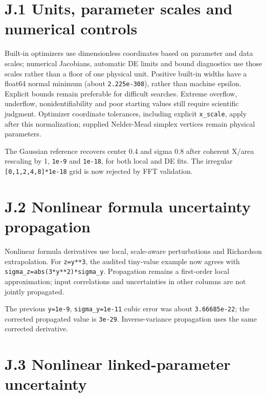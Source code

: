 \documentclass[
  10pt,
  a4paper,
  oneside]{scrreprt}
\begin{document}
\hypertarget{j.1-units-parameter-scales-and-numerical-controls}{%
\section{J.1 Units, parameter scales and numerical
controls}\label{j.1-units-parameter-scales-and-numerical-controls}}

Built-in optimizers use dimensionless coordinates based on parameter and
data scales; numerical Jacobians, automatic DE limits and bound
diagnostics use those scales rather than a floor of one physical unit.
Positive built-in widths have a float64 normal minimum (about
\texttt{2.225e-308}), rather than machine epsilon. Explicit bounds
remain preferable for difficult searches. Extreme overflow, underflow,
nonidentifiability and poor starting values still require scientific
judgment. Optimizer coordinate tolerances, including explicit
\texttt{x\_scale}, apply after this normalization; supplied Nelder-Mead
simplex vertices remain physical parameters.

The Gaussian reference recovers center 0.4 and sigma 0.8 after coherent
X/area rescaling by 1, \texttt{1e-9} and \texttt{1e-18}, for both local
and DE fits. The irregular \texttt{{[}0,1,2,4,8{]}*1e-18} grid is now
rejected by FFT validation.

\hypertarget{j.2-nonlinear-formula-uncertainty-propagation}{%
\section{J.2 Nonlinear formula uncertainty
propagation}\label{j.2-nonlinear-formula-uncertainty-propagation}}

Nonlinear formula derivatives use local, scale-aware perturbations and
Richardson extrapolation. For \texttt{z=y**3}, the audited tiny-value
example now agrees with \texttt{sigma\_z=abs(3*y**2)*sigma\_y}.
Propagation remains a first-order local approximation; input
correlations and uncertainties in other columns are not jointly
propagated.

The previous \texttt{y=1e-9}, \texttt{sigma\_y=1e-11} cubic error was
about \texttt{3.66685e-22}; the corrected propagated value is
\texttt{3e-29}. Inverse-variance propagation uses the same corrected
derivative.

\hypertarget{j.3-nonlinear-linked-parameter-uncertainty}{%
\section{J.3 Nonlinear linked-parameter
uncertainty}\label{j.3-nonlinear-linked-parameter-uncertainty}}
\end{document}
